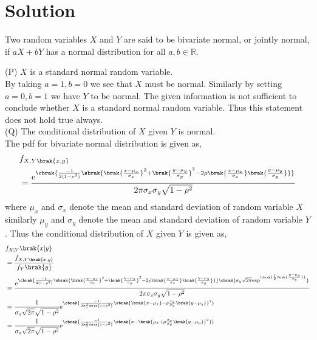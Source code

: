 \documentclass[journal,12pt,twocolumn]{IEEEtran}
\begin{document}
\section{Solution}
\begin{definition}
Two random variables $X$ and $Y$ are said to be bivariate normal, or jointly normal, if $aX+bY$ has a normal distribution for all $a,b \in \mathbb{R}$.
\end{definition}
(P) $X$ is a standard normal random  variable.\\
By taking $a=1,b=0$ we see that $X$ must be normal. Similarly by setting $a=0,b=1$ we have $Y$ to be normal. The given information is not sufficient to conclude whether $X$ is a standard normal random variable.
Thus this statement does not hold true always.
\\
(Q) The conditional distribution of $X$ given $Y$ is normal.\\
The pdf for bivariate normal distribution is given as,
\begin{equation}
    \begin{aligned}
    &f_{X,Y\brak{x,y}} \\
&= \frac{\text{e}^{\cbrak{\frac{-1}{2(1-\rho^2)}\sbrak{\brak{\frac{x-\mu_x}{\sigma_x}}^2 +  \brak{\frac{y-\mu_y}{\sigma_y}}^2-2\rho\brak{\frac{x-\mu_x}{\sigma_x}}\brak{\frac{y-\mu_y}{\sigma_y}}}}}}{2\pi\sigma_{x}\sigma_{y}\sqrt{1-\rho^2}}
    \end{aligned}
\end{equation}
where $\mu_x$ and $\sigma_x$ denote the mean and standard deviation of random variable $X$ similarly $\mu_y$ and $\sigma_y$ denote the mean and standard deviation of random variable $Y$. 
Thus the conditional distribution of $X$ given $Y$ is given as,
\begin{equation}
\begin{aligned}
&f_{X|Y}\brak{x|y} \\
&=  \frac{f_{X,Y\brak{x,y}}}{f_Y\brak{y}} \\
&= \frac{\text{e}^{\cbrak{\frac{-1}{2(1-\rho^2)}\sbrak{\brak{\frac{x-\mu_x}{\sigma_x}}^2 +  \brak{\frac{y-\mu_y}{\sigma_y}}^2-2\rho\brak{\frac{x-\mu_x}{\sigma_x}}\brak{\frac{y-\mu_y}{\sigma_y}}}} \cbrak{\sigma_y\sqrt{2\pi}\text{exp}^{{\cbrak{\frac{1}{2}\brak{\frac{y-\mu_y}{\sigma_y}}}}}}}}{2\pi\sigma_{x}\sigma_{y}\sqrt{1-\rho^2}} \\ 
&= \frac{1}{\sigma_x\sqrt{2\pi}\sqrt{1-\rho^2}}\text{e}^{\cbrak{\frac{-1}{2\sigma_{x}^2\brak{1-\rho^2}}\sbrak{\brak{x-\mu_x}-\rho\frac{\sigma_x}{\sigma_y}\brak{y-\mu_y}}^2}} \\
&= \frac{1}{\sigma_x\sqrt{2\pi}\sqrt{1-\rho^2}}\text{e}^{\cbrak{\frac{-1}{2\sigma_{x}^2\brak{1-\rho^2}}\sbrak{x-\brak{\mu_x +\rho\frac{\sigma_x}{\sigma_y}\brak{y-\mu_y}}^2}}}
\end{aligned}
\end{equation}
\end{document}
